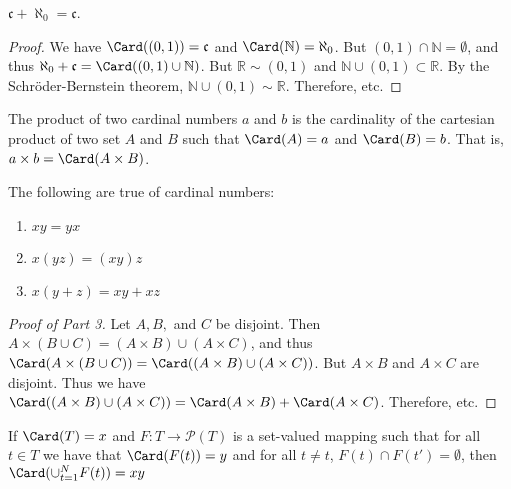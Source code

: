         \begin{theorem}
            $\mathfrak{c}+\aleph_{0}=\mathfrak{c}$.
        \end{theorem}
        \begin{proof}
            We have $\Card((0,1))=\mathfrak{c}$ and $\Card(\mathbb{N})=\aleph_{0}$.
            But $(0,1)\cap\mathbb{N}=\emptyset$, and thus
            $\aleph_{0}+\mathfrak{c}=\Card((0,1)\cup\mathbb{N})$.
            But $\mathbb{R}\sim(0,1)$ and $\mathbb{N}\cup(0,1)\subset\mathbb{R}$. By
            the Schr\"{o}der-Bernstein theorem, $\mathbb{N}\cup(0,1)\sim\mathbb{R}$.
            Therefore, etc.
        \end{proof}
        \begin{definition}
            The product of two cardinal numbers $a$ and $b$ is the cardinality of
            the cartesian product of two set $A$ and $B$ such that $\Card(A)=a$ and
            $\Card(B)=b$. That is, ${a}\times{b}=\Card({A}\times{B})$.
        \end{definition}
        \begin{theorem}
            The following are true of cardinal numbers:
            \begin{enumerate}
                \item $xy=yx$
                \item $x(yz)=(xy)z$
                \item $x(y+z)=xy+xz$
            \end{enumerate}
        \end{theorem}
        \begin{proof}[Proof of Part 3]
            Let $A,B,$ and $C$ be disjoint.
            Then
            ${A}\times{({B}\cup{C})}%
             =({A}\times{B})\cup({A}\times{C})$, and thus
            $\Card({A}\times{({B}\cup{C})})%
             =\Card(({A}\times{B})\cup({A}\times{C}))$.
            But ${A}\times{B}$ and ${A}\times{C}$ are disjoint.
            Thus we have
            $\Card(({A}\times{B})\cup({A}\times{C}))%
             =\Card({A}\times{B})+\Card({A}\times{C})$.
            Therefore, etc.
        \end{proof}
        \begin{theorem}
            If $\Card(T)=x$ and $F:{T}\rightarrow{\mathcal{P}(T)}$ is a
            set-valued mapping such that for all ${t}\in{T}$ we have that
            $\Card(F(t))=y$ and for all ${t}\ne{t}$,
            ${F(t)}\cap{F(t')}=\emptyset$, then $\Card(\cup_{t=1}^{N}F(t))=xy$
        \end{theorem}

